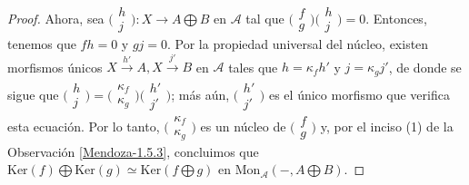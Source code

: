 \documentclass[tesis]{subfiles}
\begin{document}
\begin{proof}
    Ahora, sea $\big(\begin{smallmatrix} h \\ j \end{smallmatrix}\big):X\to A\bigoplus B$ en $\mathscr{A}$ tal que $\big(\begin{smallmatrix} f \\ g \end{smallmatrix}\big)\big(\begin{smallmatrix} h \\ j \end{smallmatrix}\big) = 0$. Entonces, tenemos que $fh=0$ y $gj=0$. Por la propiedad universal del núcleo, existen morfismos únicos $X\xrightarrow[]{h'}A, X\xrightarrow[]{j'}B$ en $\mathscr{A}$ tales que $h=\kappa_f h'$ y $j=\kappa_g j'$, de donde se sigue que $\big(\begin{smallmatrix} h \\ j \end{smallmatrix}\big) = \big( \begin{smallmatrix} \kappa_f \\ \kappa_g \end{smallmatrix} \big) \big(\begin{smallmatrix} h' \\ j' \end{smallmatrix}\big)$; más aún, $\big(\begin{smallmatrix} h' \\ j' \end{smallmatrix}\big)$ es el único morfismo que verifica esta ecuación. Por lo tanto, $\big(\begin{smallmatrix} \kappa_f \\ \kappa_g \end{smallmatrix}\big)$ es un núcleo de $\big( \begin{smallmatrix} f \\ g \end{smallmatrix}\big)$ y, por el inciso (1) de la Observación \ref{Mendoza-1.5.3}, concluimos que $\text{Ker}(f)\bigoplus \text{Ker}(g) \simeq \text{Ker}(f\bigoplus g)$ en $\text{Mon}_\mathscr{A}(-,A\bigoplus B)$.
\end{proof}
\end{document}
